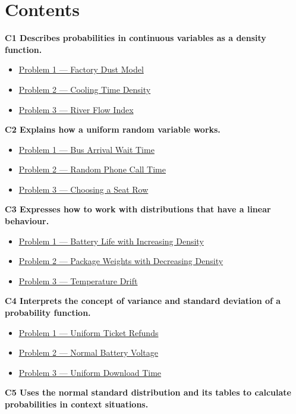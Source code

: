 


	
	\section*{Contents}
	\noindent\textbf{C1 Describes probabilities in continuous variables as a density function.}
	\begin{itemize}
		\item \hyperlink{c1-ex1}{Problem 1 — Factory Dust Model}
		\item \hyperlink{c1-ex2}{Problem 2 — Cooling Time Density}
		\item \hyperlink{c1-ex3}{Problem 3 — River Flow Index}
	\end{itemize}
	\noindent\textbf{C2 Explains how a uniform random variable works.}
	\begin{itemize}
		\item \hyperlink{c2-ex1}{Problem 1 — Bus Arrival Wait Time}
		\item \hyperlink{c2-ex2}{Problem 2 — Random Phone Call Time}
		\item \hyperlink{c2-ex3}{Problem 3 — Choosing a Seat Row}
	\end{itemize}
	\noindent\textbf{C3 Expresses how to work with distributions that have a linear behaviour.}
	\begin{itemize}
		\item \hyperlink{c3-ex1}{Problem 1 — Battery Life with Increasing Density}
		\item \hyperlink{c3-ex2}{Problem 2 — Package Weights with Decreasing Density}
		\item \hyperlink{c3-ex3}{Problem 3 — Temperature Drift}
	\end{itemize}
	\noindent\textbf{C4 Interprets the concept of variance and standard deviation of a probability function.}
	\begin{itemize}
		\item \hyperlink{c4-ex1}{Problem 1 — Uniform Ticket Refunds}
		\item \hyperlink{c4-ex2}{Problem 2 — Normal Battery Voltage}
		\item \hyperlink{c4-ex3}{Problem 3 — Uniform Download Time}
	\end{itemize}
	\noindent\textbf{C5 Uses the normal standard distribution and its tables to calculate probabilities in context situations.}
